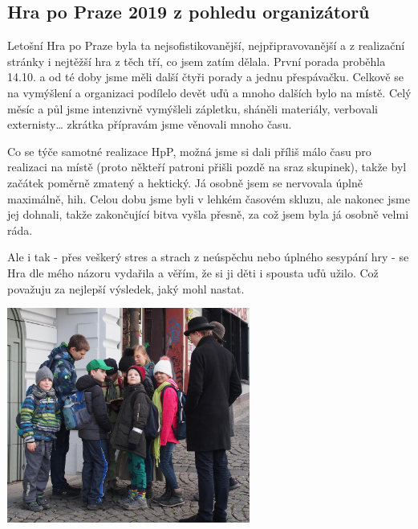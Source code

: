 \subsection*{Hra po Praze 2019 z pohledu organizátorů}
\label{sub:hra_po_praze_2019_z_pohledu_organizátorů}

Letošní Hra po Praze byla ta nejsofistikovanější, nejpřipravovanější a z realizační stránky i nejtěžší hra z těch tří, co jsem zatím dělala. První porada proběhla 14.10. a od té doby jsme měli další čtyři porady a jednu přespávačku. Celkově se na vymýšlení a organizaci podílelo devět uďů a mnoho dalších bylo na místě. Celý měsíc a půl jsme intenzivně vymýšleli zápletku, sháněli materiály, verbovali externisty… zkrátka přípravám jsme věnovali mnoho času.

Co se týče samotné realizace HpP, možná jsme si dali příliš málo času pro realizaci na místě (proto někteří patroni přišli pozdě na sraz skupinek), takže byl začátek poměrně zmatený a hektický. Já osobně jsem se nervovala úplně maximálně, hih. Celou dobu jsme byli v lehkém časovém skluzu, ale nakonec jsme jej dohnali, takže zakončující bitva vyšla přesně, za což jsem byla já osobně velmi ráda. 

\clearpage

Ale i tak - přes veškerý stres a strach z neúspěchu nebo úplného sesypání hry - se Hra dle mého názoru vydařila a věřím, že si ji děti i spousta uďů užilo. Což považuju za nejlepší výsledek, jaký mohl nastat.


\begin{center}

\includegraphics[width=8cm]{img/udo_clanky/hrapopraze.JPG}

\end{center}
\clearpage